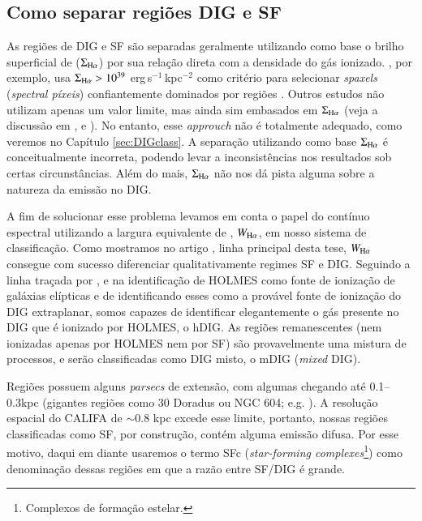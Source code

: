 \subsection{Como separar regiões DIG e SF}
\label{sec:intro:DIG:class}
As regiões de DIG e SF são separadas geralmente utilizando como base o brilho superficial de \Ha ($\Sigma_{\Ha}$) por sua relação direta com a densidade do gás ionizado. \citet{Zhang.etal.2017a}, por exemplo, usa $\Sigma_{\Ha} > 10^{39}$ erg$\,$s$^{-1}\,$kpc$^{-2}$ como critério para selecionar {\em spaxels} ({\em spectral píxeis}) confiantemente dominados por regiões \hii. Outros estudos não utilizam apenas um valor limite, mas ainda sim embasados em $\Sigma_{\Ha}$ (veja a discussão em \citealt{Zurita.etal.2000}, \citealt{Oey.etal.2007} e \citealt{Vogt.etal.2017a}). No entanto, esse {\em approuch} não é totalmente adequado, como veremos no Capítulo \ref{sec:DIGclass}. A separação utilizando como base $\Sigma_{\Ha}$ é conceitualmente incorreta, podendo levar a inconsistências nos resultados sob certas circunstâncias. Além do mais, $\Sigma_{\Ha}$ não nos dá pista alguma sobre a natureza da emissão no DIG.

A fim de solucionar esse problema levamos em conta o papel do contínuo espectral utilizando a largura equivalente de \Ha, $W_{\Ha}$, em nosso sistema de classificação. Como mostramos no artigo \citet[][Apêndice \ref{apendice:DIGpaper0}]{Lacerda.etal.2018}, linha principal desta tese, $W_{\Ha}$ consegue com sucesso diferenciar qualitativamente regimes SF e DIG. Seguindo a linha traçada por \citet{Binette.etal.1994a}, \citet{Stasinska.etal.2008a} e \citet{CidFernandes.etal.2011a} na identificação de HOLMES como fonte de ionização de galáxias elípticas e de \citet{FloresFajardo.etal.2011a} identificando esses como a provável fonte de ionização do DIG extraplanar, somos capazes de identificar elegantemente o gás presente no DIG que é ionizado por HOLMES, o hDIG. As regiões remanescentes (nem ionizadas apenas por HOLMES nem por SF) são provavelmente uma mistura de processos, e serão classificadas como DIG misto, o mDIG ({\em mixed} DIG).

Regiões \hii possuem alguns {\em parsecs} de extensão, com algumas chegando até 0.1--0.3kpc (gigantes regiões como 30 Doradus ou NGC 604; e.g. \citealt{Rosa.y.Enrique.2000}). A resolução espacial do CALIFA de $\sim 0.8$ kpc excede esse limite, portanto, nossas regiões classificadas como SF, por construção, contém alguma emissão difusa. Por esse motivo, daqui em diante usaremos o termo SFc ({\em star-forming complexes}\footnote{Complexos de formação estelar.}) como denominação dessas regiões em que a razão entre SF/DIG é grande.


